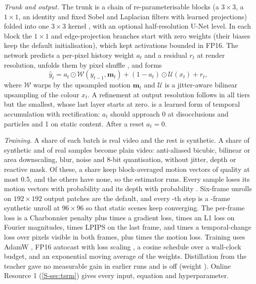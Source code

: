 \documentclass[pdflatex,sn-mathphys-num,iicol]{sn-jnl}
\begin{document}
\emph{Trunk and output.} The trunk is a chain of re-parameterisable blocks (a $3\times3$, a $1\times1$, an identity and fixed Sobel and Laplacian filters with learned projections) folded into one $3\times3$ kernel \cite{zhang2021ecbsr}, with an optional half-resolution U-Net level. In each block the $1\times1$ and edge-projection branches start with zero weights (their biases keep the default initialisation), which kept activations bounded in FP16. The network predicts a per-pixel history weight $a_t$ and a residual $r_t$ at render resolution, unfolds them by pixel shuffle \cite{shi2016espcn}, and forms
\begin{equation}
\hat{y}_t = a_t \odot \mathcal{W}(\hat{y}_{t-1}, \mathbf{m}_t) + (1-a_t) \odot \mathcal{U}(x_t) + r_t ,\label{eq:tsr}
\end{equation}
where $\mathcal{W}$ warps by the upsampled motion $\mathbf{m}_t$ and $\mathcal{U}$ is a jitter-aware bilinear upsampling of the colour $x_t$. A refinement at output resolution follows in all tiers but the smallest, whose last layer starts at zero.  is a learned form of temporal accumulation with rectification: $a_t$ should approach 0 at disocclusions and particles and 1 on static content. After a reset $a_t=0$.

\emph{Training.} A share  of each batch is real video and the rest is synthetic. A share  of synthetic and  of real samples become plain video: anti-aliased bicubic, bilinear or area downscaling, blur, noise and 8-bit quantisation, without jitter, depth or reactive mask. Of these, a share  keep block-averaged motion vectors of quality at most 0.5, and the others have none, so the estimator runs. Every sample loses its motion vectors with probability  and its depth with probability . Six-frame unrolls on $192\times192$ output patches are the default, and every -th step is a -frame synthetic unroll at $96\times96$ so that static scenes keep converging. The per-frame loss is a Charbonnier penalty plus  times a gradient loss,  times an L1 loss on Fourier magnitudes,  times LPIPS \cite{zhang2018lpips} on the last frame, and  times a temporal-change loss over pixels visible in both frames, plus  times the motion loss. Training uses AdamW \cite{loshchilov2019adamw}, FP16 autocast with loss scaling \cite{micikevicius2018mixed}, a cosine schedule over a wall-clock budget, and an exponential moving average of the weights. Distillation from the teacher gave no measurable gain in earlier runs and is off (weight ). Online Resource 1 (\cref{S-sec:tsrm}) gives every input, equation and hyperparameter.
\end{document}
